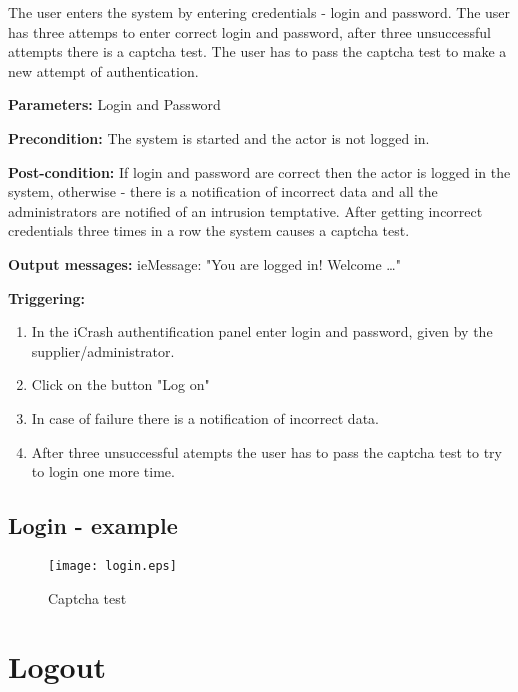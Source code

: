 The user enters the system by entering credentials - login and password. The
user has three attemps to enter correct login and password, after three
unsuccessful attempts there is a captcha test. The user has to pass the captcha
test to make a new attempt of authentication.

\begin{description}
	\item \textbf{Parameters:} Login and Password
	\item \textbf{Precondition:} The system is started and the actor is not logged
	in. 
	\item \textbf{Post-condition:} If login and password are correct then the
	actor is logged in the system, otherwise - there is a notification
	of incorrect data and all the administrators are notified of an intrusion
	temptative. After getting incorrect credentials three times in a row the
	system causes a captcha test. 
	\item \textbf{Output messages:} ieMessage: "You are logged in! Welcome
	\ldots"
	
	\item \textbf{Triggering:}
	
	\begin{enumerate}
		\item In the iCrash authentification panel enter login and password, given by
		the supplier/administrator.
		\item Click on the button "Log on"
		\item In case of failure there is a notification of incorrect data.
		\item After three unsuccessful atempts the user has to pass the captcha test
		to try to login one more time.
	\end{enumerate}
\end{description}

\subsection{Login - example}

\begin{figure}[h]
    \texttt{[image: login.eps]}
	\caption{Captcha test}
\end{figure}

\section{Logout}
\label{operation:Logout}


